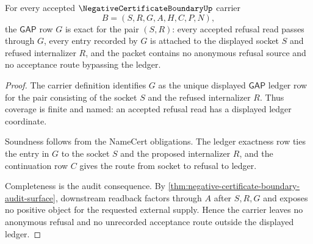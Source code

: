 \begin{theorem}
\label{thm:negative-certificate-boundary-gap-ledger-exactness}
For every accepted $\NegativeCertificateBoundaryUp$ carrier
$$
B=(S,R,G,A,H,C,P,N),
$$
the $\mathsf{GAP}$ row $G$ is exact for the pair $(S,R)$: every accepted refusal read passes through $G$, every entry recorded by $G$ is attached to the displayed socket $S$ and refused internalizer $R$, and the packet contains no anonymous refusal source and no acceptance route bypassing the ledger.
\end{theorem}
\begin{proof}
The carrier definition identifies $G$ as the unique displayed $\mathsf{GAP}$ ledger row for the pair consisting of the socket $S$ and the refused internalizer $R$. Thus coverage is finite and named: an accepted refusal read has a displayed ledger coordinate.

Soundness follows from the NameCert obligations. The ledger exactness row ties the entry in $G$ to the socket $S$ and the proposed internalizer $R$, and the continuation row $C$ gives the route from socket to refusal to ledger.

Completeness is the audit consequence. By \autoref{thm:negative-certificate-boundary-audit-surface}, downstream readback factors through $A$ after $S,R,G$ and exposes no positive object for the requested external supply. Hence the carrier leaves no anonymous refusal and no unrecorded acceptance route outside the displayed ledger.
\end{proof}


